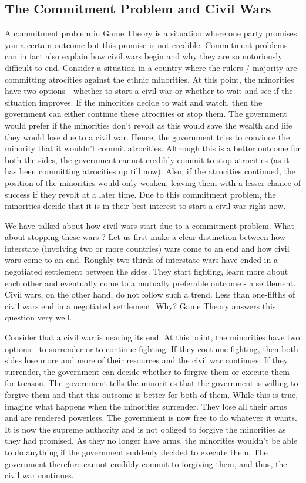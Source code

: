 \documentclass{article}
\theoremstyle{definition}
\begin{document}
\subsection{The Commitment Problem and Civil Wars}

A commitment problem in Game Theory is a situation where one party promises you a certain outcome but this promise is not credible. Commitment problems can in fact also explain how civil wars begin and why they are so notoriously difficult to end. Consider a situation in a country where the rulers / majority are committing atrocities against the ethnic minorities. At this point, the minorities have two options - whether to start a civil war or whether to wait and see if the situation improves. If the minorities decide to wait and watch, then the government can either continue these atrocities or stop them. The government would prefer if the minorities don't revolt as this would save the wealth and life they would lose due to a civil war. Hence, the government tries to convince the minority that it wouldn't commit atrocities. Although this is a better outcome for both the sides, the government cannot credibly commit to stop atrocities (as it has been committing atrocities up till now). Also, if the atrocities continued, the position of the minorities would only weaken, leaving them with a lesser chance of success if they revolt at a later time. Due to this commitment problem, the minorities decide that it is in their best interest to start a civil war right now. \smallskip

We have talked about how civil wars start due to a commitment problem. What about stopping these wars ? Let us first make a clear distinction between how interstate (involving two or more countries) wars come to an end and how civil wars come to an end. Roughly two-thirds of interstate wars have ended in a negotiated settlement between the sides. They start fighting, learn more about each other and eventually come to a mutually preferable outcome - a settlement. Civil wars, on the other hand, do not follow such a trend. Less than one-fifths of civil wars end in a negotiated settlement. Why? Game Theory answers this question very well. \smallskip

Consider that a civil war is nearing its end. At this point, the minorities have two options - to surrender or to continue fighting. If they continue fighting, then both sides lose more and more of their resources and the civil war continues. If they surrender, the government can decide whether to forgive them or execute them for treason. The government tells the minorities that the government is willing to forgive them and that this outcome is better for both of them. While this is true, imagine what happens when the minorities surrender. They lose all their arms and are rendered powerless. The government is now free to do whatever it wants. It is now the supreme authority and is not obliged to forgive the minorities as they had promised. As they no longer have arms, the minorities wouldn't be able to do anything if the government suddenly decided to execute them. The government therefore cannot credibly commit to forgiving them, and thus, the civil war continues. \smallskip
\end{document}
